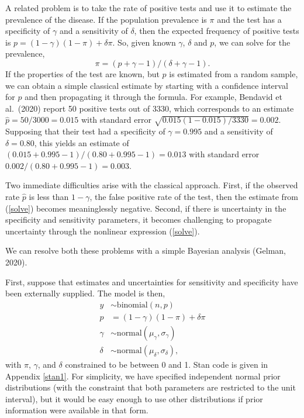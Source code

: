 \documentclass[11pt]{article}
\begin{document}
A related problem is to take the rate of positive tests and use it to estimate the prevalence of the disease.  If the population prevalence is $\pi$ and the test has a specificity of $\gamma$ and a sensitivity of $\delta$, then the expected frequency of positive tests is $p=(1-\gamma)(1- \pi)+ \delta\pi$.  So, given known $\gamma$, $\delta$ and $p$, we can solve for the prevalence,
\begin{equation}\label{solve}
  \pi=(p + \gamma - 1)/(\delta + \gamma - 1).
  \end{equation}
  If the properties of the test are known, but $p$ is estimated from a random sample, we can obtain a simple classical estimate by starting with a confidence interval for $p$ and then propagating it through the formula.  For example, Bendavid et al.\ (2020) report 50 positive tests out of 3330, which corresponds to an estimate  $\hat{p}=50/3000=0.015$ with standard error $\sqrt{0.015(1-0.015)/3330}=0.002$.  Supposing that their test had a specificity of $\gamma=0.995$ and a sensitivity of $\delta=0.80$, this yields an estimate of $(0.015 + 0.995 - 1)/(0.80 + 0.995 -1) = 0.013$ with standard error $0.002/(0.80 + 0.995 -1) = 0.003$.

 Two immediate difficulties arise with the classical approach.  First, if the observed rate $\hat{p}$ is less than  $1-\gamma$, the false positive rate of the test, then the estimate from (\ref{solve}) becomes meaninglessly negative.  Second, if there is uncertainty in the specificity and sensitivity parameters, it becomes challenging to propagate uncertainty through the nonlinear expression (\ref{solve}).

We can resolve both these problems with a simple Bayesian analysis (Gelman, 2020).

First, suppose that estimates and uncertainties for sensitivity and specificity have been externally supplied.  The model is then,
\begin{align}
\nonumber  y & \sim \mbox{binomial} (n, p) \\
\nonumber   p & = (1-\gamma)(1- \pi)+ \delta\pi \\
\nonumber  \gamma & \sim \mbox{normal}(\mu_{\gamma}, \sigma_{\gamma}) \\
\label{normals}  \delta & \sim \mbox{normal}(\mu_{\delta}, \sigma_{\delta}),
\end{align}
with $\pi$, $\gamma$, and $\delta$ constrained to be between 0 and 1.
Stan code is given in Appendix \ref{stan1}.
For simplicity, we have specified independent normal prior distributions (with the constraint that both parameters are restricted to the unit interval), but it would be easy enough to use other distributions if prior information were available in that form.
\end{document}
